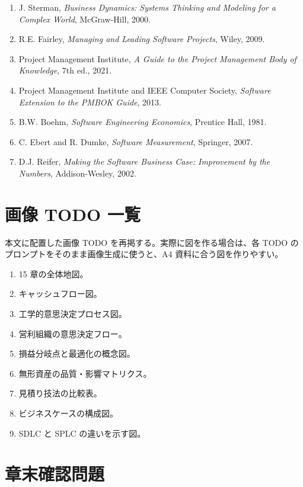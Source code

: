 \documentclass[a4paper,11pt]{article}
\begin{document}
\begin{enumerate}
  \item J. Sterman, \textit{Business Dynamics: Systems Thinking and Modeling for a Complex World}, McGraw-Hill, 2000.
  \item R.E. Fairley, \textit{Managing and Leading Software Projects}, Wiley, 2009.
  \item Project Management Institute, \textit{A Guide to the Project Management Body of Knowledge}, 7th ed., 2021.
  \item Project Management Institute and IEEE Computer Society, \textit{Software Extension to the PMBOK Guide}, 2013.
  \item B.W. Boehm, \textit{Software Engineering Economics}, Prentice Hall, 1981.
  \item C. Ebert and R. Dumke, \textit{Software Measurement}, Springer, 2007.
  \item D.J. Reifer, \textit{Making the Software Business Case: Improvement by the Numbers}, Addison-Wesley, 2002.
\end{enumerate}

\section{画像 TODO 一覧}

本文に配置した画像 TODO を再掲する。実際に図を作る場合は、各 TODO のプロンプトをそのまま画像生成に使うと、A4 資料に合う図を作りやすい。

\begin{enumerate}
  \item 15 章の全体地図。
  \item キャッシュフロー図。
  \item 工学的意思決定プロセス図。
  \item 営利組織の意思決定フロー。
  \item 損益分岐点と最適化の概念図。
  \item 無形資産の品質・影響マトリクス。
  \item 見積り技法の比較表。
  \item ビジネスケースの構成図。
  \item SDLC と SPLC の違いを示す図。
\end{enumerate}

\section{章末確認問題}
\end{document}

